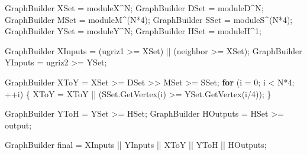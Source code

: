 \documentclass[
]{article}
\newenvironment{Shaded}{}{}
\newcommand{\ControlFlowTok}[1]{\textcolor[rgb]{0.00,0.44,0.13}{\textbf{#1}}}
\newcommand{\DecValTok}[1]{\textcolor[rgb]{0.25,0.63,0.44}{#1}}
\newcommand{\NormalTok}[1]{#1}
\newcommand{\OperatorTok}[1]{\textcolor[rgb]{0.40,0.40,0.40}{#1}}
\begin{document}
\begin{Shaded}
\begin{Highlighting}[]
\NormalTok{GraphBuilder XSet }\OperatorTok{=}\NormalTok{ moduleX}\OperatorTok{\^{}}\NormalTok{N}\OperatorTok{;}
\NormalTok{GraphBuilder DSet }\OperatorTok{=}\NormalTok{ moduleD}\OperatorTok{\^{}}\NormalTok{N}\OperatorTok{;}
\NormalTok{GraphBuilder MSet }\OperatorTok{=}\NormalTok{ moduleM}\OperatorTok{\^{}(}\NormalTok{N}\OperatorTok{*}\DecValTok{4}\OperatorTok{);}
\NormalTok{GraphBuilder SSet }\OperatorTok{=}\NormalTok{ moduleS}\OperatorTok{\^{}(}\NormalTok{N}\OperatorTok{*}\DecValTok{4}\OperatorTok{);}
\NormalTok{GraphBuilder YSet }\OperatorTok{=}\NormalTok{ moduleY}\OperatorTok{\^{}}\NormalTok{N}\OperatorTok{;}
\NormalTok{GraphBuilder HSet }\OperatorTok{=}\NormalTok{ moduleH}\OperatorTok{\^{}}\DecValTok{1}\OperatorTok{;}

\NormalTok{GraphBuilder XInputs }\OperatorTok{=} \OperatorTok{(}\NormalTok{ugriz1 }\OperatorTok{\textgreater{}=}\NormalTok{ XSet}\OperatorTok{)} \OperatorTok{||} \OperatorTok{(}\NormalTok{neighbor }\OperatorTok{\textgreater{}=}\NormalTok{ XSet}\OperatorTok{);}
\NormalTok{GraphBuilder YInputs }\OperatorTok{=}\NormalTok{ ugriz2 }\OperatorTok{\textgreater{}=}\NormalTok{ YSet}\OperatorTok{;}

\NormalTok{GraphBuilder XToY }\OperatorTok{=}\NormalTok{ XSet }\OperatorTok{\textgreater{}=}\NormalTok{ DSet }\OperatorTok{\textgreater{}\textgreater{}}\NormalTok{ MSet }\OperatorTok{\textgreater{}=}\NormalTok{ SSet}\OperatorTok{;}
\ControlFlowTok{for} \OperatorTok{(}\NormalTok{i }\OperatorTok{=} \DecValTok{0}\OperatorTok{;}\NormalTok{ i }\OperatorTok{\textless{}}\NormalTok{ N}\OperatorTok{*}\DecValTok{4}\OperatorTok{;} \OperatorTok{++}\NormalTok{i}\OperatorTok{)}
\OperatorTok{\{}
\NormalTok{    XToY }\OperatorTok{=}\NormalTok{ XToY }\OperatorTok{||} \OperatorTok{(}\NormalTok{SSet}\OperatorTok{.}\NormalTok{GetVertex}\OperatorTok{(}\NormalTok{i}\OperatorTok{)} \OperatorTok{\textgreater{}=}\NormalTok{ YSet}\OperatorTok{.}\NormalTok{GetVertex}\OperatorTok{(}\NormalTok{i}\OperatorTok{/}\DecValTok{4}\OperatorTok{));}
\OperatorTok{\}}

\NormalTok{GraphBuilder YToH }\OperatorTok{=}\NormalTok{ YSet }\OperatorTok{\textgreater{}=}\NormalTok{ HSet}\OperatorTok{;}
\NormalTok{GraphBuilder HOutputs }\OperatorTok{=}\NormalTok{ HSet }\OperatorTok{\textgreater{}=}\NormalTok{ output}\OperatorTok{;}

\NormalTok{GraphBuilder final }\OperatorTok{=}\NormalTok{ XInputs }\OperatorTok{||}\NormalTok{ YInputs }\OperatorTok{||}\NormalTok{ XToY }\OperatorTok{||}\NormalTok{ YToH }\OperatorTok{||}\NormalTok{ HOutputs}\OperatorTok{;} 
\end{Highlighting}
\end{Shaded}
\end{document}
